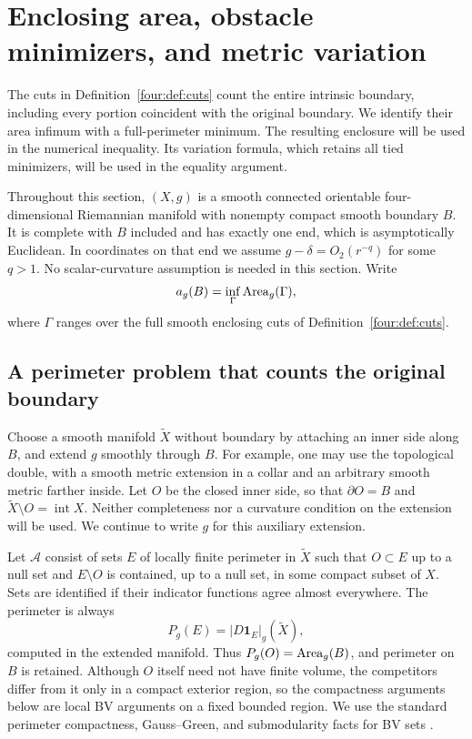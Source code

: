 \section{Enclosing area, obstacle minimizers, and metric variation}
\label{rig4:sec:enclosures}
\label{rig4:enc:section}

The cuts in Definition~\ref{four:def:cuts} count the entire intrinsic
boundary, including every portion coincident with the original boundary.
We identify their area infimum with a full-perimeter minimum. The resulting
enclosure will be used in the numerical inequality. Its variation formula,
which retains all tied minimizers, will be used in the equality argument.

Throughout this section, $(X,g)$ is a smooth connected orientable
four-dimensional Riemannian manifold with nonempty compact smooth
boundary $B$. It is complete with $B$ included and has exactly one end,
which is asymptotically Euclidean. In coordinates on that end we assume
$g-\delta=O_2(r^{-q})$ for some $q>1$. No scalar-curvature assumption is
needed in this section. Write
\[
 a_g(B)=\inf_{\Gamma}\operatorname{Area}_g(\Gamma),
\]
where $\Gamma$ ranges over the full smooth enclosing cuts of
Definition~\ref{four:def:cuts}.

\subsection{A perimeter problem that counts the original boundary}
\label{rig4:enc:obstacle-setup}

Choose a smooth manifold $\widetilde X$ without boundary by attaching an
inner side along $B$, and extend $g$ smoothly through $B$. For example,
one may use the topological double, with a smooth metric extension in a
collar and an arbitrary smooth metric farther inside. Let $O$ be the
closed inner side, so that $\partial O=B$ and
$\widetilde X\setminus O=\operatorname{int}X$. Neither completeness nor a
curvature condition on the extension will be used. We continue to write
$g$ for this auxiliary extension.

Let $\mathcal A$ consist of sets $E$ of locally finite perimeter in
$\widetilde X$ such that $O\subset E$ up to a null set and
$E\setminus O$ is contained, up to a null set, in some compact subset
of $X$.
Sets are identified if their indicator functions agree almost
everywhere. The perimeter is always
\begin{equation}
 P_g(E)=|D\mathbf 1_E|_g(\widetilde X),
 \label{rig4:enc:full-perimeter}
\end{equation}
computed in the extended manifold. Thus $P_g(O)=\operatorname{Area}_g(B)$, and
perimeter on $B$ is retained. Although $O$ itself need not have finite
volume, the competitors differ from it only in a compact exterior
region, so the compactness arguments below are local BV arguments on a
fixed bounded region. We use the standard perimeter compactness,
Gauss--Green, and submodularity facts for BV sets
\cite{AmbrosioFuscoPallara2000,Maggi2012}.

